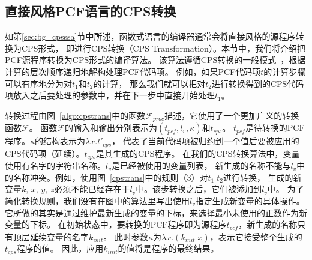 \subsection{直接风格PCF语言的CPS转换} \label{sec:cpstrans}

如第\ref{sec:bg_cpsssa}节中所述，函数式语言的编译器通常会将直接风格的源程序转换为CPS形式，
即进行CPS转换（CPS Transformation）。本节中，我们将介绍把PCF源程序转换为CPS形式的编译算法。
该算法遵循CPS转换的一般模式~\cite{plotkin1975call,danvy2007one}，根据计算的层次顺序递归地解构处理PCF代码项。
例如，如果PCF代码项$t$的计算步骤可以有序地分为对$t_1$和$t_2$的计算，
那么我们就可以把对$t_2$进行转换得到的CPS代码项放入之后要处理的参数中，并在下一步中直接开始处理$t_1$。 

转换过程由图~\ref{algo:cpstrans}中的函数$\mathcal{F}_{proc}$描述，它使用了一个更加广义的转换函数$\mathcal{F}$。
函数$\mathcal{F}$的输入和输出分别表示为$(t_{pcf}, l_v, \kappa)$和$t_{cps}$。
$t_{pcf}$是待转换的PCF程序。$\kappa$的结构表示为$\lambda x. t'_{cps}$，
代表了当前代码项被归约到一个值后要被应用的CPS代码项（延续）。$t_{cps}$是其生成的CPS程序。
在我们的CPS转换算法中，变量使用有名字的字符串名称。$l_v$是已经被使用的变量列表，
新生成的名称不能与$l_v$中的名称冲突。例如，使用图~\ref{cpstrans}中的规则（3）对$t_1\; t_2$进行转换，
生成的新变量$k,\, x,\, y,\, z$必须不能已经存在于$l_v$中。该步转换之后，它们被添加到$l_v$中。
为了简化转换规则，我们没有在图中的算法里写出使用$l_v$指定生成新变量的具体操作。
它所做的其实是通过维护最新生成的变量的下标，来选择最小未使用的正数作为新变量的下标。
在初始状态中，要转换的PCF程序即为源程序$t_{pcf}$，新生成的名称只有顶层延续变量的名字$k_{init}$。
此时参数$\kappa$为$\lambda x. (k_{init}\; x)$，表示它接受整个生成的$t_{cps}$程序的值。
因此，应用$k_{init}$的值将是程序的最终结果。

